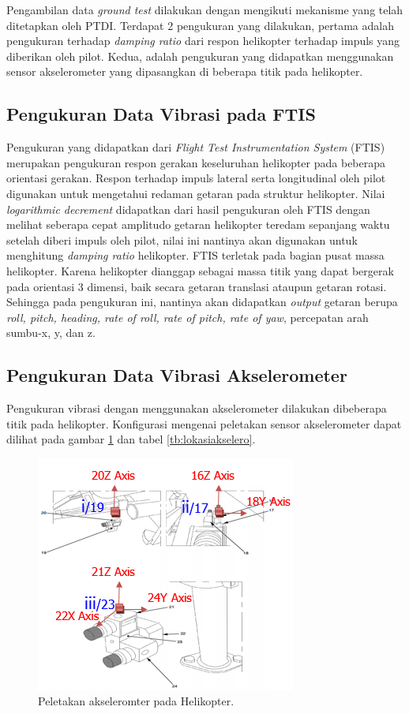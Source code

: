 Pengambilan data \textit{ground test} dilakukan dengan mengikuti mekanisme yang telah ditetapkan oleh PTDI. Terdapat 2 pengukuran yang dilakukan, pertama adalah pengukuran terhadap \textit{damping ratio} dari respon helikopter terhadap impuls yang diberikan oleh pilot. Kedua, adalah pengukuran yang didapatkan menggunakan sensor akselerometer yang dipasangkan di beberapa titik pada helikopter.

\subsection{Pengukuran Data Vibrasi pada FTIS}
Pengukuran yang didapatkan dari \textit{Flight Test Instrumentation System} (FTIS) merupakan pengukuran respon gerakan keseluruhan helikopter pada beberapa orientasi gerakan. Respon terhadap impuls lateral serta longitudinal oleh pilot digunakan untuk mengetahui redaman getaran pada struktur helikopter. Nilai \textit{logarithmic decrement} didapatkan dari hasil pengukuran oleh FTIS dengan melihat seberapa cepat amplitudo getaran helikopter teredam sepanjang waktu setelah diberi impuls oleh pilot, nilai ini nantinya akan digunakan untuk menghitung \textit{damping ratio} helikopter. FTIS terletak pada bagian pusat massa helikopter. Karena helikopter dianggap sebagai massa titik yang dapat bergerak pada orientasi 3 dimensi, baik secara getaran translasi ataupun getaran rotasi. Sehingga pada pengukuran ini, nantinya akan didapatkan \textit{output} getaran berupa \textit{roll, pitch, heading, rate of roll, rate of pitch, rate of yaw}, percepatan arah sumbu-x, y, dan z.

\subsection{Pengukuran Data Vibrasi Akselerometer}
Pengukuran vibrasi dengan menggunakan akselerometer dilakukan dibeberapa titik pada helikopter. Konfigurasi mengenai peletakan sensor akselerometer dapat dilihat pada gambar \ref{peletakan_sensor.png} dan tabel \ref{tb:lokasiakselero}.

\begin{figure}[H]
	\centering
	\includegraphics[width=0.6\linewidth]{gambar/peletakan_sensor.png}
	\caption{Peletakan akseleromter pada Helikopter.}
	\label{peletakan_sensor.png}
\end{figure}

